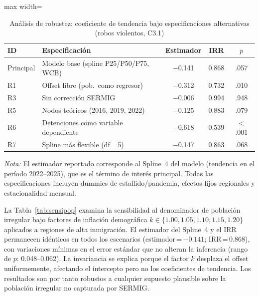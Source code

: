 \documentclass[12pt,a4paper]{article}
\newcommand{\tablenote}[1]{%
  \vspace{2pt}%
  \begin{minipage}{\linewidth}%
    \footnotesize\textit{Nota:} #1%
  \end{minipage}%
}
\begin{document}
\begin{table}[H]
\centering
\caption{An\'alisis de robustez: coeficiente de tendencia bajo especificaciones
alternativas (robos violentos, C3.1)}
\label{tab:robustez}
\small
\begin{adjustbox}{max width=\columnwidth}
\begin{tabular}{llccc}
\toprule
\textbf{ID} & \textbf{Especificaci\'on} & \textbf{Estimador} & \textbf{IRR} & $p$ \\
\midrule
Principal & Modelo base (spline P25/P50/P75, WCB) & $-$0.141 & 0.868 & .057 \\
\midrule
R1 & Offset libre (pob.\ como regresor)    & $-$0.312 & 0.732 & .010 \\
R3 & Sin correcci\'on SERMIG               & $-$0.006 & 0.994 & .948 \\
R5 & Nodos te\'oricos (2016, 2019, 2022)   & $-$0.125 & 0.883 & .079 \\
R6 & Detenciones como variable dependiente & $-$0.618 & 0.539 & $<$.001 \\
R7 & Spline m\'as flexible (df\,=\,5)      & $-$0.147 & 0.863 & .068 \\
\bottomrule
\end{tabular}
\end{adjustbox}
\tablenote{El estimador reportado corresponde al Spline~4 del modelo (tendencia en el
per\'iodo 2022--2025), que es el t\'ermino de inter\'es principal. Todas las
especificaciones incluyen dummies de estallido/pandemia, efectos fijos regionales y
estacionalidad mensual.}
\end{table}

La Tabla~\ref{tab:sensipop} examina la sensibilidad al denominador de poblaci\'on
irregular bajo factores de inflaci\'on demogr\'afica $k \in \{1.00, 1.05, 1.10,
1.15, 1.20\}$ aplicados a regiones de alta inmigraci\'on. El estimador del Spline~4 y el IRR
permanecen id\'enticos en todos los escenarios (estimador\,=\,$-0.141$; IRR\,=\,0.868),
con variaciones m\'inimas en el error est\'andar que no alteran la inferencia (rango
de $p$: 0.048--0.062). La
invariancia se explica porque el factor $k$ desplaza el offset uniformemente, afectando
el intercepto pero no los coeficientes de tendencia. Los resultados son por tanto robustos
a cualquier supuesto plausible sobre la poblaci\'on irregular no capturada por SERMIG.
\end{document}
